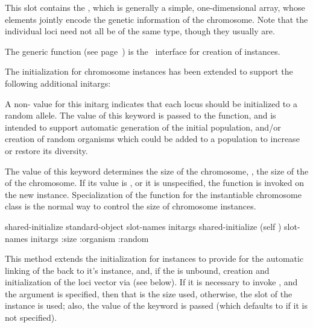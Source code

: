 {{This slot contains the , which is generally a simple,
one-dimensional array, whose elements jointly encode the genetic information of the
chromosome. Note that the individual loci need not all be of the same type, though
they usually are.
\par}%

\gap

\filbreak
{\samepage


The generic function  (see
page~\pageref{method:make-chromosome}) is the \geco\ interface for creation
of  instances.

The initialization for chromosome instances has been extended to support the following
additional initargs:


A non- value for this initarg indicates that each locus should be
initialized to a random allele. The value of this keyword is passed to the
 function, and is intended to support automatic
generation of the initial population, and/or
creation of random organisms which could be added to a population to increase or
restore its diversity.
\par}%

\filbreak
{\samepage
{}	\label{chromosome:size.initarg}

The value of this keyword determines the size of the chromosome, \ie, the size of
the  of the chromosome. If its value is , or it is
unspecified, the function  is invoked on the new instance.
Specialization of the  function for the instantiable chromosome class is
the normal way to control the size of chromosome instances.
\par}%

\gap
  
\filbreak
{\samepage
	


\Eggeneric shared-initialize {standard-object slot-names \rest initargs}
 shared-initialize {(self ) slot-names \rest initargs
	\key :size :organism :random}

This method extends the initialization for  instances to provide for the 
automatic linking of the   back to it's  instance,
and, if the  is unbound, creation and initialization of the loci vector via
 (see below).
If it is necessary to invoke , and the  argument is
specified, then that is the size used, otherwise, the  slot of the 
instance is used; also, the value of the  keyword is passed (which defaults to  if
it is not specified).\
\par}%

}
